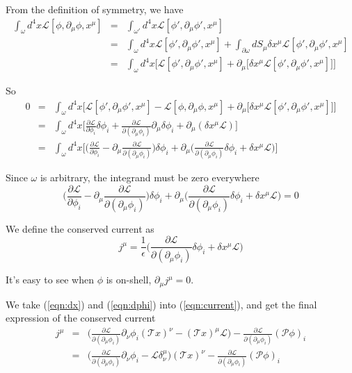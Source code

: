 \documentclass[12pt]{book}
\begin{document}
	From the definition of symmetry, we have
	\begin{eqnarray}
		\int_{\omega}d^4x\mathcal{L}[\phi,\partial_\mu\phi,x^\mu]&=&\int_{\omega'}d^4x\mathcal{L}[\phi',\partial_\mu\phi',x^\mu]\\
		&=&\int_{\omega}d^4x\mathcal{L}[\phi',\partial_\mu\phi',x^\mu]+\int_{\partial\omega}dS_\mu\delta x^\mu\mathcal{L}[\phi',\partial_\mu\phi',x^\mu]\\
		&=&\int_{\omega}d^4x\Big[\mathcal{L}[\phi',\partial_\mu\phi',x^\mu]+\partial_\mu\big[\delta x^\mu\mathcal{L}[\phi',\partial_\mu\phi',x^\mu]\big]\Big]
	\end{eqnarray}
	
	So
	\begin{eqnarray}
		0&=&\int_{\omega}d^4x\Big[\mathcal{L}[\phi',\partial_\mu\phi',x^\mu]-\mathcal{L}[\phi,\partial_\mu\phi,x^\mu]+\partial_\mu\big[\delta x^\mu\mathcal{L}[\phi',\partial_\mu\phi',x^\mu]\big]\Big]\\
		&=&\int_{\omega}d^4x\Big[\frac{\partial\mathcal{L}}{\partial\phi_i}\delta\phi_i+\frac{\partial\mathcal{L}}{\partial(\partial_\mu\phi_i)}\partial_\mu\delta\phi_i+\partial_\mu(\delta x^\mu\mathcal{L})\Big]\\
		&=&\int_{\omega}d^4x\Big[\Big(\frac{\partial\mathcal{L}}{\partial\phi_i}-\partial_\mu\frac{\partial\mathcal{L}}{\partial(\partial_\mu\phi_i)}\Big)\delta\phi_i+\partial_\mu\Big(\frac{\partial\mathcal{L}}{\partial(\partial_\mu\phi_i)}\delta\phi_i+\delta x^\mu\mathcal{L}\Big)\Big]
	\end{eqnarray}
	
	Since $\omega$ is arbitrary, the integrand must be zero everywhere
	\begin{equation}
		\Big(\frac{\partial\mathcal{L}}{\partial\phi_i}-\partial_\mu\frac{\partial\mathcal{L}}{\partial(\partial_\mu\phi_i)}\Big)\delta\phi_i+\partial_\mu\Big(\frac{\partial\mathcal{L}}{\partial(\partial_\mu\phi_i)}\delta\phi_i+\delta x^\mu\mathcal{L}\Big)=0 \label{eqn:nother_a}
	\end{equation}
	
	We define the conserved current	as
	\begin{equation}
		j^\mu=\frac 1 \epsilon\Big(\frac{\partial\mathcal{L}}{\partial(\partial_\mu\phi_i)}\delta\phi_i+\delta x^\mu\mathcal{L}\Big) \label{eqn:current}
	\end{equation}
	
	It's easy to see when $\phi$ is on-shell, $\partial_\mu j^\mu=0$.
	
	We take (\ref{eqn:dx}) and (\ref{eqn:dphi}) into (\ref{eqn:current}), and get the final expression of the conserved current	
	\begin{eqnarray}
		j^\mu&=&\Big(\frac{\partial\mathcal{L}}{\partial(\partial_\mu\phi_i)}\partial_\nu\phi_i(\mathcal Tx)^\nu-(\mathcal T x)^\mu\mathcal{L}\Big)-\frac{\partial\mathcal{L}}{\partial(\partial_\mu\phi_i)}(\mathcal P\phi)_i\\
		&=&\Big(\frac{\partial\mathcal{L}}{\partial(\partial_\mu\phi_i)}\partial_\nu\phi_i-\mathcal{L}\delta^\mu_\nu\Big)(\mathcal Tx)^\nu-\frac{\partial\mathcal{L}}{\partial(\partial_\mu\phi_i)}(\mathcal P\phi)_i \label{eqn:current2}
	\end{eqnarray}
	
\end{document}
